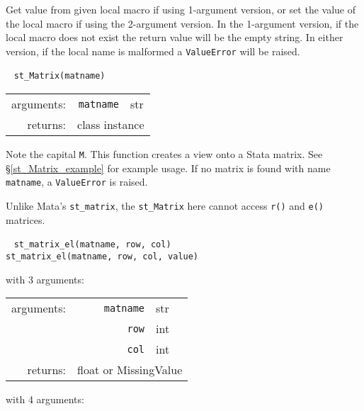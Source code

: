 \documentclass{article}
\begin{document}
			\vspace{1.5mm}
			\noindent Get value from given local macro if using 1-argument version, or set the value of the local macro if using the 2-argument version. In the 1-argument version, if the local macro does not exist the return value will be the empty string. In either version, if the local name is malformed a \lstinline{ValueError} will be raised. \newline
			
						
			\ \newline
			\noindent \lstinline$st_Matrix(matname)$
								
			\vspace{1.5mm}
			\noindent 
			\indent \begin{tabular}{rrl}
					arguments: & \texttt{matname} & str \\
					returns: & \multicolumn{2}{l}{class instance}
				\end{tabular}
								
			\vspace{1.5mm}
			\noindent Note the capital \lstinline{M}. This function creates a view onto a Stata matrix. See \S\ref{st_Matrix_example} for example usage. If no matrix is found with name \lstinline{matname}, a \lstinline{ValueError} is raised. 
			
			Unlike Mata's \lstinline{st_matrix}, the \lstinline{st_Matrix} here cannot access \lstinline{r()} and \lstinline{e()} matrices. \newline
			
			
			\ \newline
			\noindent \lstinline$st_matrix_el(matname, row, col)$ \\
			\noindent \lstinline$st_matrix_el(matname, row, col, value)$
								
			\vspace{1.5mm}
			\noindent 
			\indent with 3 arguments:
			
			\indent \qquad \begin{tabular}{rrl}
					arguments: & \texttt{matname} & str \\
						& \texttt{row} & int \\
						& \texttt{col} & int \\
					returns: & \multicolumn{2}{l}{float or MissingValue}
				\end{tabular}
				
			\vspace{1.5mm}
			\indent with 4 arguments:
			
\end{document}
